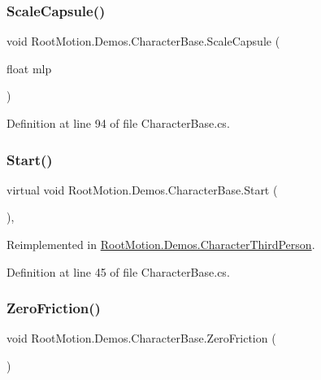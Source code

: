 \subsubsection{\texorpdfstring{Scale\+Capsule()}{ScaleCapsule()}}
{\footnotesize\ttfamily void Root\+Motion.\+Demos.\+Character\+Base.\+Scale\+Capsule (\begin{DoxyParamCaption}\item[{float}]{mlp }\end{DoxyParamCaption})\hspace{0.3cm}{\ttfamily [protected]}}



Definition at line 94 of file Character\+Base.\+cs.

\mbox{\label{class_root_motion_1_1_demos_1_1_character_base_aa228af260814ffafccbfefb73915c03e}} 
\subsubsection{\texorpdfstring{Start()}{Start()}}
{\footnotesize\ttfamily virtual void Root\+Motion.\+Demos.\+Character\+Base.\+Start (\begin{DoxyParamCaption}{ }\end{DoxyParamCaption})\hspace{0.3cm}{\ttfamily [protected]}, {\ttfamily [virtual]}}



Reimplemented in \mbox{\hyperlink{class_root_motion_1_1_demos_1_1_character_third_person_a6548d90a80293a3a87c51caf7b9b9a93}{Root\+Motion.\+Demos.\+Character\+Third\+Person}}.



Definition at line 45 of file Character\+Base.\+cs.

\mbox{\label{class_root_motion_1_1_demos_1_1_character_base_a1f41f972d31a880d63bf65430b053e5e}} 
\subsubsection{\texorpdfstring{Zero\+Friction()}{ZeroFriction()}}
{\footnotesize\ttfamily void Root\+Motion.\+Demos.\+Character\+Base.\+Zero\+Friction (\begin{DoxyParamCaption}{ }\end{DoxyParamCaption})\hspace{0.3cm}{\ttfamily [protected]}}



